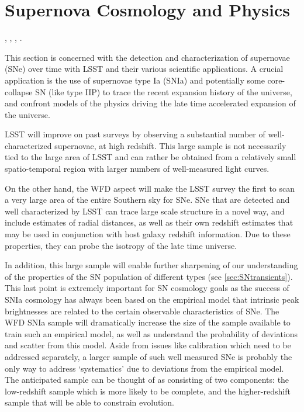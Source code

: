 
%
%
%

\section{Supernova Cosmology and Physics}
\def\secname{supernovae}\label{sec:\secname}

,
,
,
.

This section is concerned with the detection and characterization of
supernovae (SNe) over time with LSST and their various scientific
applications. A crucial application is the use of supernovae type
Ia (SNIa) and potentially some core-collapse SN (like type IIP) to trace
the recent expansion history of the universe, and confront models of the
physics driving the late time accelerated expansion of the universe.

LSST will improve on past surveys by observing a substantial number of well-characterized 
supernovae, at high redshift. This large sample is not necessarily tied to the large area of LSST 
and can rather be obtained from a relatively small spatio-temporal region with larger numbers of 
well-measured light curves.

On the other hand, the WFD aspect will make the LSST survey 
the first to scan a very large area of the entire Southern sky for
SNe. SNe that are detected and well characterized by LSST can trace
large scale structure in a novel way, and include estimates of radial distances, as 
well as
their own redshift estimates that may be used in conjunction with host
galaxy redshift information. Due to these properties, they can probe the
isotropy of the late time universe.    

In addition, this large sample will
enable further sharpening of our understanding of the properties of the
SN population of different types (see \autoref{sec:SNtransients}). This last point is extremely 
important
for SN cosmology goals as the success of SNIa cosmology has always been
based on the empirical model that intrinsic peak brightnesses are
related to the certain observable characteristics of SNe.  The WFD SNIa
sample will dramatically increase the size of the sample available to
train such an empirical model, as well as understand the probability of
deviations and scatter from this model. Aside from issues like
calibration which need to be addressed separately, a larger sample of
such well measured SNe is probably the only way to address `systematics'
due to deviations from the empirical model. The anticipated sample can
be thought of as consisting of two components:  the low-redshift sample
which is more likely to be complete, and the higher-redshift sample that
will be able to constrain evolution.

